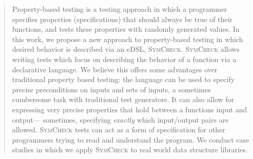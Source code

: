 \begin{abstract}
Property-based testing is a testing approach in which
a programmer specifies properties
(specifications)
that should always be true
of their functions, and tests these properties
with randomly generated values.
In this work,
we propose a new approach to property-based testing
in which desired behavior is described via an eDSL, {\footnotesize{\textsc{SymCheck}}}.
{\footnotesize{\textsc{SymCheck}}} allows writing tests
which focus on describing the behavior of a function
via a declarative language.
We believe this offers some advantages over
traditional property based testing:
the language can be used to specify precise preconditions on inputs and sets of inputs,
a sometimes cumbersome task with traditional test generators.
It can also allow for expressing very precise properties that hold
between a functions input and output--- sometimes, specifying \textit{exactly} which input/output pairs are allowed.
{\footnotesize{\textsc{SymCheck}}} tests can  act as a form of specification
for other programmers trying to read and understand the program.
We conduct case studies in which we apply
{\footnotesize{\textsc{SymCheck}}} to real world data structure libraries.
\end{abstract}

